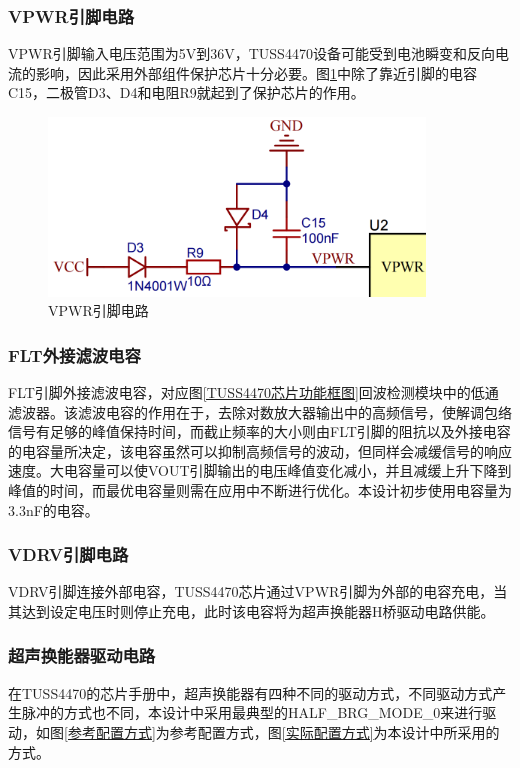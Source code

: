 \subsubsection{VPWR引脚电路}
VPWR引脚输入电压范围为5V到36V，TUSS4470设备可能受到电池瞬变和反向电流的影响，因此采用外部组件保护芯片十分必要。图\ref{VPWR引脚}中除了靠近引脚的电容C15，二极管D3、D4和电阻R9就起到了保护芯片的作用。
\begin{figure}[ht]
	\centering
	\includegraphics[width=10cm]{figure/VPWR PIN.png}
	\caption{VPWR引脚电路}
	\label{VPWR引脚}
\end{figure}
\subsubsection{FLT外接滤波电容}
FLT引脚外接滤波电容，对应图\ref{TUSS4470芯片功能框图}回波检测模块中的低通滤波器。该滤波电容的作用在于，去除对数放大器输出中的高频信号，使解调包络信号有足够的峰值保持时间，而截止频率的大小则由FLT引脚的阻抗以及外接电容的电容量所决定，该电容虽然可以抑制高频信号的波动，但同样会减缓信号的响应速度。大电容量可以使VOUT引脚输出的电压峰值变化减小，并且减缓上升下降到峰值的时间，而最优电容量则需在应用中不断进行优化。本设计初步使用电容量为3.3nF的电容。
\subsubsection{VDRV引脚电路}    
VDRV引脚连接外部电容，TUSS4470芯片通过VPWR引脚为外部的电容充电，当其达到设定电压时则停止充电，此时该电容将为超声换能器H桥驱动电路供能。
\subsubsection{超声换能器驱动电路}
在TUSS4470的芯片手册中，超声换能器有四种不同的驱动方式，不同驱动方式产生脉冲的方式也不同，本设计中采用最典型的HALF\_BRG\_MODE\_0来进行驱动，如图\ref{参考配置方式}为参考配置方式，图\ref{实际配置方式}为本设计中所采用的方式。

